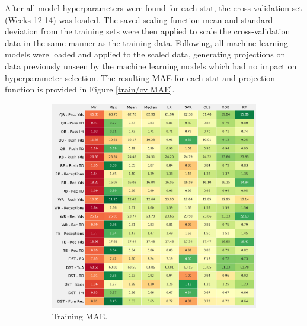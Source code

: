 \documentclass[12pt]{article}
\begin{document}
After all model hyperparameters were found for each stat, the cross-validation set (Weeks 12-14) was loaded. The saved scaling function mean and standard deviation from the training sets were then applied to scale the cross-validation data in the same manner as the training data. Following, all machine learning models were loaded and applied to the scaled data, generating projections on data previously unseen by the machine learning models which had no impact on hyperparameter selection. The resulting MAE for each stat and projection function is provided in Figure \ref{train/cv MAE}.

\begin{figure}[H]
  \centering
  \begin{subfigure}[b]{0.490\textwidth}
    \centering
    \includegraphics[width=1\textwidth]{../figures/essential_train_MAE_table}
    \caption{Training MAE.}
  \end{subfigure}
  \hfill
  \begin{subfigure}[b]{0.490\textwidth}
    \centering

\end{subfigure}
\end{figure}
\end{document}
